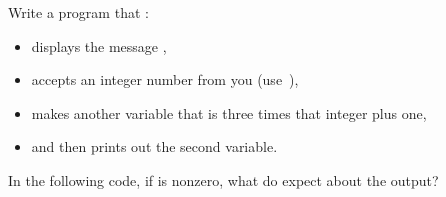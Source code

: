\begin{exercise}
  \label{ex:read-writet3np1}
  Write a program that :
  \begin{itemize}
  \item displays the message ,
  \item accepts an integer number from you (use~),
  \item makes another variable that is three times that integer plus one,
  \item and then prints out the second variable.
  \end{itemize}
\end{exercise}

\begin{exercise}
  \label{ex:f-elt-rev2}
  In the following code, if  is nonzero, what do expect about
  the output?
\end{exercise}
